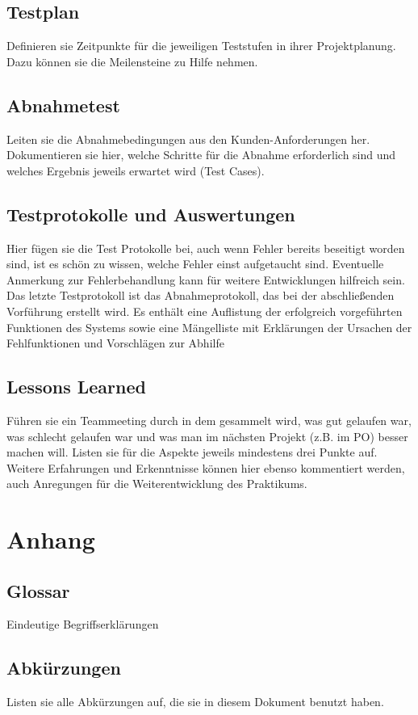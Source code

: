 \documentclass[
   draft=false
  ,paper=a4
  ,twoside=true
  ,fontsize=11pt
  ,headsepline
  ,DIV11
  ,parskip=full+
]{scrartcl} %
\begin{document}
\subsection{Testplan}
Definieren sie Zeitpunkte für die jeweiligen Teststufen in ihrer Projektplanung. Dazu können sie die Meilensteine zu Hilfe nehmen.
\subsection{Abnahmetest}
Leiten sie die Abnahmebedingungen aus den Kunden-Anforderungen her. Dokumentieren sie hier, welche Schritte für die Abnahme erforderlich sind und welches Ergebnis jeweils erwartet wird (Test Cases).
\subsection{Testprotokolle und Auswertungen}
Hier fügen sie die Test Protokolle bei, auch wenn Fehler bereits beseitigt worden sind, ist es schön zu wissen, welche Fehler einst aufgetaucht sind. Eventuelle Anmerkung zur Fehlerbehandlung kann für weitere Entwicklungen hilfreich sein.
Das letzte Testprotokoll ist das Abnahmeprotokoll, das bei der abschließenden Vorführung erstellt wird. Es enthält eine Auflistung der erfolgreich vorgeführten Funktionen des Systems sowie eine Mängelliste mit Erklärungen der Ursachen der Fehlfunktionen und  Vorschlägen zur Abhilfe
\subsection{Lessons Learned}
Führen sie ein Teammeeting durch in dem gesammelt wird, was gut gelaufen war, was schlecht gelaufen war und was man im nächsten Projekt (z.B. im PO) besser machen will. Listen sie für die Aspekte jeweils mindestens drei Punkte auf. Weitere Erfahrungen und Erkenntnisse können hier ebenso kommentiert werden, auch Anregungen für die Weiterentwicklung des Praktikums.
\newpage
\section{Anhang}
\subsection{Glossar}
Eindeutige Begriffserklärungen
\subsection{Abkürzungen}
Listen sie alle Abkürzungen auf, die sie in diesem Dokument benutzt haben.
\end{document}
